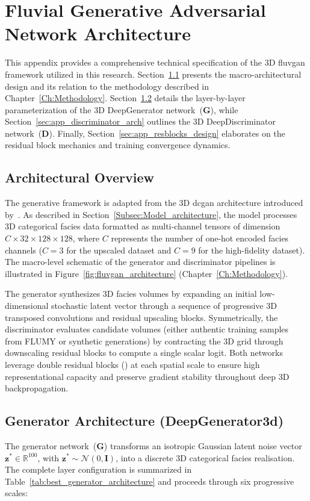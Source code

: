 \chapter{Fluvial Generative Adversarial Network Architecture}\label{Appendix:FluvGAN_Architecture}
This appendix provides a comprehensive technical specification of the 3D \gls{fluvgan} framework utilized in this research. Section~\ref{sec:app_arch_overview} presents the macro-architectural design and its relation to the methodology described in Chapter~\ref{Ch:Methodology}. Section~\ref{sec:app_generator_arch} details the layer-by-layer parameterization of the 3D DeepGenerator network~($\mathbf{G}$), while Section~\ref{sec:app_discriminator_arch} outlines the 3D DeepDiscriminator network~($\mathbf{D}$). Finally, Section~\ref{sec:app_resblocks_design} elaborates on the residual block mechanics and training convergence dynamics.

\section{Architectural Overview}\label{sec:app_arch_overview}
The generative framework is adapted from the 3D \gls{dcgan} architecture introduced by~\textcite{rongier2025afluvgan}. As described in Section~\ref{Subsec:Model_architecture}, the model processes 3D categorical facies data formatted as multi-channel tensors of dimension $C \times 32 \times 128 \times 128$, where $C$ represents the number of one-hot encoded facies channels ($C=3$ for the upscaled dataset and $C=9$ for the high-fidelity dataset). The macro-level schematic of the generator and discriminator pipelines is illustrated in Figure~\ref{fig:fluvgan_architecture} (Chapter~\ref{Ch:Methodology}).

The generator synthesizes 3D facies volumes by expanding an initial low-dimensional stochastic latent vector through a sequence of progressive 3D transposed convolutions and residual upscaling blocks. Symmetrically, the discriminator evaluates candidate volumes (either authentic training samples from FLUMY or synthetic generations) by contracting the 3D grid through downscaling residual blocks to compute a single scalar logit. Both networks leverage double residual blocks () at each spatial scale to ensure high representational capacity and preserve gradient stability throughout deep 3D backpropagation.

\section{Generator Architecture (DeepGenerator3d)}\label{sec:app_generator_arch}
The generator network~($\mathbf{G}$) transforms an isotropic Gaussian latent noise vector $\mathbf{z}^* \in \mathbb{R}^{100}$, with $\mathbf{z}^* \sim \mathcal{N}(0, \mathbf{I})$, into a discrete 3D categorical facies realisation. The complete layer configuration is summarized in Table~\ref{tab:best_generator_architecture} and proceeds through six progressive scales:

